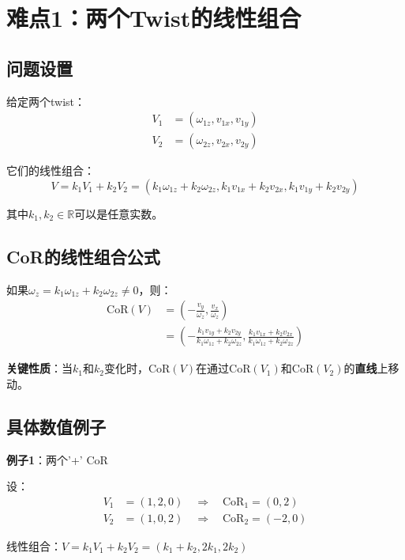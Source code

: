 \documentclass[12pt,a4paper]{article}
\begin{document}
\section{难点1：两个Twist的线性组合}

\subsection{问题设置}

给定两个twist：
\begin{align}
V_1 &= (\omega_{1z}, v_{1x}, v_{1y}) \\
V_2 &= (\omega_{2z}, v_{2x}, v_{2y})
\end{align}

它们的线性组合：
\begin{equation}
V = k_1 V_1 + k_2 V_2 = (k_1 \omega_{1z} + k_2 \omega_{2z}, k_1 v_{1x} + k_2 v_{2x}, k_1 v_{1y} + k_2 v_{2y})
\end{equation}

其中$k_1, k_2 \in \mathbb{R}$可以是任意实数。

\subsection{CoR的线性组合公式}

如果$\omega_z = k_1 \omega_{1z} + k_2 \omega_{2z} \neq 0$，则：
\begin{align}
\text{CoR}(V) &= \left(-\frac{v_y}{\omega_z}, \frac{v_x}{\omega_z}\right) \\
&= \left(-\frac{k_1 v_{1y} + k_2 v_{2y}}{k_1 \omega_{1z} + k_2 \omega_{2z}}, \frac{k_1 v_{1x} + k_2 v_{2x}}{k_1 \omega_{1z} + k_2 \omega_{2z}}\right)
\end{align}

\textbf{关键性质}：当$k_1$和$k_2$变化时，$\text{CoR}(V)$在通过$\text{CoR}(V_1)$和$\text{CoR}(V_2)$的\textbf{直线}上移动。

\subsection{具体数值例子}

\textbf{例子1}：两个'+' CoR

设：
\begin{align}
V_1 &= (1, 2, 0) \quad \Rightarrow \quad \text{CoR}_1 = (0, 2) \\
V_2 &= (1, 0, 2) \quad \Rightarrow \quad \text{CoR}_2 = (-2, 0)
\end{align}

线性组合：$V = k_1 V_1 + k_2 V_2 = (k_1 + k_2, 2k_1, 2k_2)$
\end{document}
